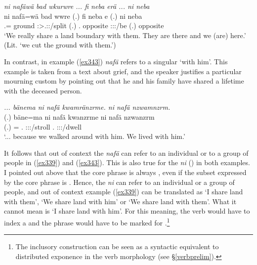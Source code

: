 \begin{exe}
	\ex \emph{ni nafäwä bad wkurwre ... fi neba erä ... ni neba}\\
	\gll ni nafä=wä bad wwre (.) fi neba e (.) ni neba\\
	\Fnsg{} \Third\Pl.\Assoc=\Emph{} ground \Fpl:\Sbj>\Tsg.\F:\Nonpast:\Ipfv/split (.) \Third.\Abs{} opposite \Stpl:\Sbj:\Nonpast:\Ipfv/be (.) \First{} opposite\\
	\trans `We really share a land boundary with them. They are there and we (are) here.' (Lit. `we cut the ground with them.')
	\label{ex339}
\end{exe}

In contrast, in example (\ref{ex343}) \emph{nafä} refers to a singular `with him'. This example is taken from a text about grief, and the speaker justifies a particular mourning custom by pointing out that he and his family have shared a lifetime with the deceased person.

\begin{exe}
	\ex \emph{... bänema ni nafä kwamränzrme. ni nafä nzwamnzrm.}\\
	\gll (.) bäne=ma ni nafä kwanzrme ni nafä nzwanzrm\\
	(.) \Recog=\Char{} \Fnsg{} \Third\Pl.\Assoc{} \Fpl:\Sbj:\Pst:\Dur/stroll \Fnsg{} \Third\Pl.\Assoc{} \Fpl:\Sbj:\Pst:\Dur/dwell\\
	\trans `... because we walked around with him. We lived with him.'
	\label{ex343}
\end{exe}

It follows that out of context the  \emph{nafä} can refer to an individual or to a group of people in (\ref{ex339}) and (\ref{ex343}). This is also true for the  \emph{ni} (\Fnsg) in both examples. I pointed out above that the core phrase is always , even if the subset expressed by the core phrase is . Hence, the  \emph{ni} can refer to an individual or a group of people, and out of context example (\ref{ex339}) can be translated as `I share land with them', `We share land with him' or `We share land with them'. What it cannot mean is `I share land with him'. For this meaning, the verb would have to index a  and the  phrase would have to be marked for  .\footnote{The inclusory construction can be seen as a syntactic equivalent to distributed exponence in the verb morphology (see \S{}\ref{verbprelim}).}\\

